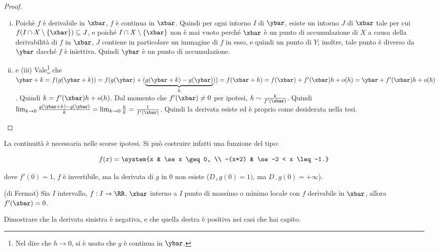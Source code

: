 \documentclass[11pt]{article}
\begin{document}
	\begin{proof}\nl
		\begin{enumerate}[(i)]
			\item Poichè $f$ è derivabile in $\xbar$, $f$ è continua
			in $\xbar$. Quindi per ogni intorno $I$ di $\ybar$, esiste
			un intorno $J$ di $\xbar$ tale per cui $f(I \cap X \setminus \{ \xbar \}) \subseteq J$, e poiché $I \cap X \setminus \{\xbar\}$ non
			è mai vuoto perché $\xbar$ è un punto di accumulazione di $X$ a causa della derivabilità di $f$ in $\xbar$, $J$ contiene in particolare un immagine di $f$ in esso, e quindi un punto di $Y$;
			inoltre, tale punto è diverso da $\ybar$ dacché $f$ è
			iniettiva. Quindi $\ybar$ è un punto di accumulazione.
			\item e (iii) Vale\footnote{Nel dire che $h \to 0$, si è usato che $g$ è
			continua in $\ybar$.} che $\ybar + k = f(g(\ybar + k)) = f(g(\ybar) + (\underbrace{g(\ybar + k) - g(\ybar)}_h)) = f(\xbar + h) =
			f(\xbar) + f'(\xbar) h + o(h) = \ybar + f'(\xbar) h + o(h)$. Quindi $k = f'(\xbar) h + o(h)$. Dal momento che $f'(\xbar) \neq 0$
			per ipotesi, $h \sim \frac{k}{f'(\xbar)}$. Quindi
			$\lim_{k \to 0} \frac{g(\ybar + k) - g(\ybar)}{k} = \lim_{k \to 0} \frac{h}{k} = \frac{1}{f'(\xbar)}$. Quindi la derivata esiste
			ed è proprio come desiderata nella tesi.
 		\end{enumerate}
	\end{proof}

	\begin{example}
		La continuità è necessaria nelle scorse ipotesi. Si può costruire
		infatti una funzione del tipo:
		
		\[ f(x) = \system{x & \se x \geq 0, \\ -(x+2) & \se -2 < x \leq -1.} \]
		
		dove $f'(0) = 1$, $f$ è invertibile, ma la derivata di $g$ in $0$ non
		esiste ($D_+ g(0) = 1)$, ma $D_- g(0) = +\infty$).
	\end{example}

	\begin{theorem} (di Fermat)
		Sia $I$ intervallo, $f : I \to \RR$, $\xbar$ interno a $I$ punto
		di massimo o minimo locale con $f$ derivabile in $\xbar$, allora
		$f'(\xbar) = 0$.
	\end{theorem}

	\begin{example}
		Dimostrare che la derivata sinistra è negativa, e che quella
		destra è positiva nei casi che hai capito.
	\end{example}
\end{document}
